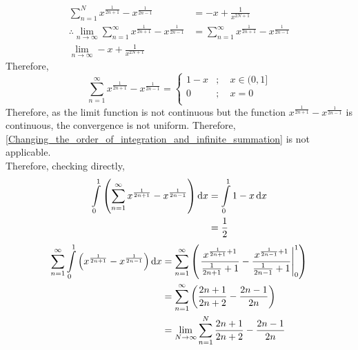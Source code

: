\documentclass[fleqn, a4paper, 12pt, twoside]{article}
\theoremstyle{definition}
\theoremstyle{theorem}
\begin{document}
\begin{solution}
	\begin{align*}
		\sum\limits_{n = 1}^{N} x^{\frac{1}{2 n + 1}} - x^{\frac{1}{2 n - 1}}                                           & = -x + \frac{1}{x^{2 N + 1}}                                                 \\
		\therefore \lim\limits_{n \to\infty} \sum\limits_{n = 1}^{\infty} x^{\frac{1}{2 n + 1}} - x^{\frac{1}{2 n - 1}} & = \sum\limits_{n = 1}^{\infty} x^{\frac{1}{2 n + 1}} - x^{\frac{1}{2 n - 1}} \\
		\lim\limits_{n \to \infty} -x + \frac{1}{x^{2 N + 1}}
	\end{align*}
	Therefore,
	\begin{equation*}
		\sum\limits_{n = 1}^{\infty} x^{\frac{1}{2 n + 1}} - x^{\frac{1}{2 n - 1}} = 
			\begin{cases}
				1 - x & ;\quad x \in (0,1] \\
				0     & ;\quad x = 0       \\
			\end{cases}
	\end{equation*}
	Therefore, as the limit function is not continuous but the function $x^{\frac{1}{2 n + 1}} - x^{\frac{1}{2 n - 1}}$ is continuous, the convergence is not uniform.
	Therefore, \autoref{Changing_the_order_of_integration_and_infinite_summation} is not applicable.\\
	Therefore, checking directly,
	\begin{align*}
		\int\limits_{0}^{1} \left( \sum\limits_{n = 1}^{\infty} x^{\frac{1}{2 n + 1}} - x^{\frac{1}{2 n - 1}} \right) \dif x &= \int\limits_{0}^{1} 1 - x \dif x\\
		&= \frac{1}{2}
	\end{align*}
	\begin{align*}
		\sum\limits_{n = 1}^{\infty} \int\limits_{0}^{1} \left( x^{\frac{1}{2 n + 1}} - x^{\frac{1}{2 n - 1}} \right) \dif x & = \sum\limits_{n = 1}^{\infty} \left( \left. \frac{x^{\frac{1}{2 n + 1} + 1}}{\frac{1}{2 n + 1} + 1} - \frac{x^{\frac{1}{2 n - 1} + 1}}{\frac{1}{2 n - 1} + 1} \right|_{0}^{1} \right) \\
                                                                                                                                     & = \sum\limits_{n = 1}^{\infty} \left( \frac{2 n + 1}{2 n + 2} - \frac{2 n - 1}{2 n} \right)                                                                                            \\
                                                                                                                                     & = \lim\limits_{N \to \infty} \sum\limits_{n = 1}^{N} \frac{2 n + 1}{2 n + 2} - \frac{2 n - 1}{2 n}                                                                                     \\

\end{align*}
\end{solution}
\end{document}
